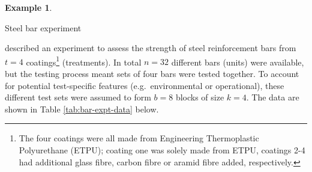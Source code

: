 \documentclass[
]{book}
\theoremstyle{definition}
\theoremstyle{definition}
\newtheorem{example}{Example}[chapter]
\theoremstyle{definition}
\theoremstyle{definition}
\theoremstyle{remark}
\begin{document}
\begin{example}
\protect\hypertarget{exm:blocks-bars}{}\label{exm:blocks-bars}

Steel bar experiment \citep[ch.~4]{Morris2011}

\citet{KSN2005} described an experiment to assess the strength of steel reinforcement bars from \(t=4\) coatings\footnote{The four coatings were all made from Engineering Thermoplastic Polyurethane (ETPU); coating one was solely made from ETPU, coatings 2-4 had additional glass fibre, carbon fibre or aramid fibre added, respectively.} (treatments). In total \(n=32\) different bars (units) were available, but the testing process meant sets of four bars were tested together. To account for potential test-specific features (e.g.~environmental or operational), these different test sets were assumed to form \(b=8\) blocks of size \(k=4\). The data are shown in Table \ref{tab:bar-expt-data} below.


\end{example}
\end{document}
